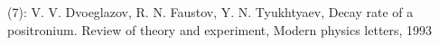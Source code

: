 \documentclass[preview]{standalone}
\begin{document}
\begin{center}
(7): V. V. Dvoeglazov, R. N. Faustov, Y. N. Tyukhtyaev, Decay rate of a positronium. Review of theory and experiment, Modern physics letters, 1993
\end{center}
\end{document}
